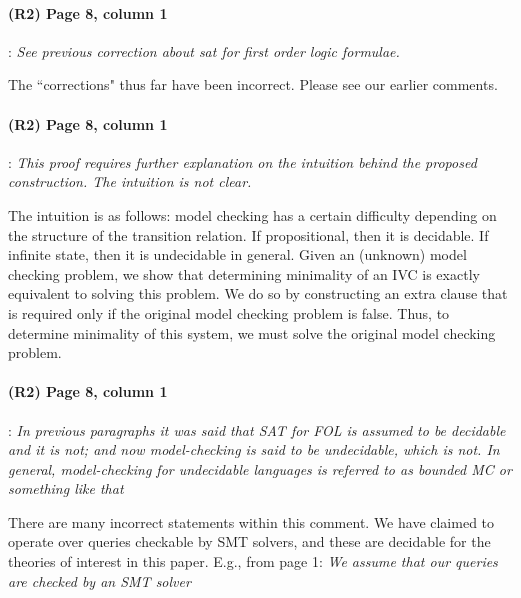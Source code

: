 \documentclass{article}
\begin{document}
\paragraph{(R2) Page 8, column 1}: \textit{See previous correction about sat for first
order logic formulae.}
\vspace{0.05in}

\noindent The ``corrections" thus far have been incorrect. Please see our earlier comments.

\paragraph{(R2) Page 8, column 1}: \textit{This proof requires further explanation on the
intuition behind the proposed construction. The intuition is not clear.}
\vspace{0.05in}

\noindent The intuition is as follows: model checking has a certain difficulty depending on the structure of the transition relation.  If propositional, then it is decidable. If infinite state, then it is undecidable in general.  Given an (unknown) model checking problem, we show that determining minimality of an IVC is exactly equivalent to solving this problem.  We do so by constructing an extra clause that is required only if the original model checking problem is false.  Thus, to determine minimality of this system, we must solve the original model checking problem.


\paragraph{(R2) Page 8, column 1}: \textit{In previous paragraphs it was said that SAT for FOL is assumed to be decidable and it is not; and now model-checking is said to be undecidable, which is not. In general, model-checking for undecidable languages is referred to as bounded MC or something like that}
\vspace{0.05in}

\noindent There are many incorrect statements within this comment.  We have claimed to operate over queries checkable by SMT solvers, and these are decidable for the theories of interest in this paper.  E.g., from page 1: \textit{We assume that our queries are checked by an SMT solver}
\end{document}
